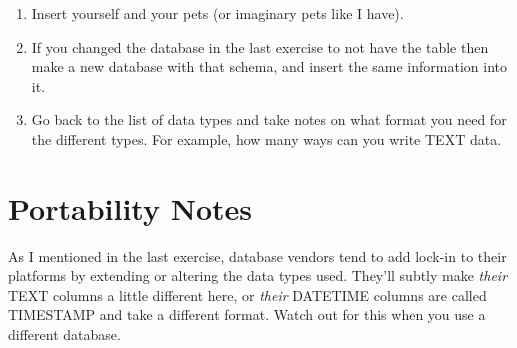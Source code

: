 \begin{enumerate}
\item Insert yourself and your pets (or imaginary pets like I have).
\item If you changed the database in the last exercise to not have the 
     table then make a new database with that schema,
    and insert the same information into it.
\item Go back to the list of data types and take notes on what format
    you need for the different types. For example, how many ways can you
    write TEXT data.
\end{enumerate}

\section{Portability Notes}

As I mentioned in the last exercise, database vendors tend to add lock-in
to their platforms by extending or altering the data types used.  They'll
subtly make \emph{their} TEXT columns a little different here, or \emph{their}
DATETIME columns are called TIMESTAMP and take a different format.  Watch
out for this when you use a different database.
